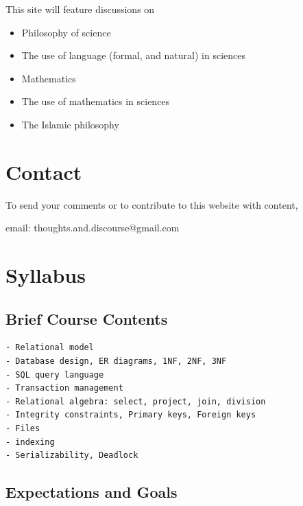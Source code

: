 \documentclass[
  letterpaper,
  DIV=11,
  numbers=noendperiod]{scrreprt}
\providecommand{\tightlist}{%
  \setlength{\itemsep}{0pt}\setlength{\parskip}{0pt}}\usepackage{longtable,booktabs,array}
\begin{document}

This site will feature discussions on

\begin{itemize}
\tightlist
\item
  Philosophy of science
\item
  The use of language (formal, and natural) in sciences
\item
  Mathematics
\item
  The use of mathematics in sciences
\item
  The Islamic philosophy
\end{itemize}

\chapter*{Contact}\label{contact-2}


To send your comments or to contribute to this website with content,

email: thoughts.and.discourse@gmail.com

\chapter{Syllabus}\label{syllabus}

\section{Brief Course Contents}\label{brief-course-contents}

\begin{verbatim}
- Relational model
- Database design, ER diagrams, 1NF, 2NF, 3NF
- SQL query language
- Transaction management
- Relational algebra: select, project, join, division
- Integrity constraints, Primary keys, Foreign keys
- Files 
- indexing
- Serializability, Deadlock
\end{verbatim}

\section{Expectations and Goals}\label{expectations-and-goals}
\end{document}
